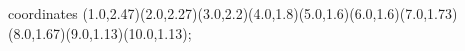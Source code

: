 					coordinates { (1.0,2.47)(2.0,2.27)(3.0,2.2)(4.0,1.8)(5.0,1.6)(6.0,1.6)(7.0,1.73)(8.0,1.67)(9.0,1.13)(10.0,1.13)};